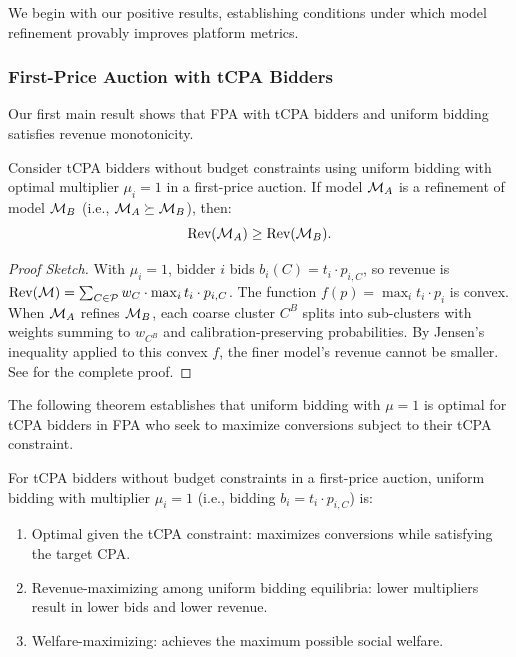 We begin with our positive results, establishing conditions under which model refinement provably improves platform metrics.

\subsubsection{First-Price Auction with tCPA Bidders}

Our first main result shows that FPA with tCPA bidders and uniform bidding satisfies revenue monotonicity.

\begin{theorem}
\label{thm:fpa-revenue}
Consider tCPA bidders without budget constraints using uniform bidding with optimal multiplier $\mu_i = 1$ in a first-price auction. If model $\mathcal{M}_A$ is a refinement of model $\mathcal{M}_B$ (i.e., $\mathcal{M}_A \succeq \mathcal{M}_B$), then:
\begin{equation}
\text{Rev}(\mathcal{M}_A) \geq \text{Rev}(\mathcal{M}_B).
\end{equation}
\end{theorem}

\begin{proof}[Proof Sketch]
With $\mu_i = 1$, bidder $i$ bids $b_i(C) = t_i \cdot p_{i,C}$, so revenue is $\text{Rev}(\mathcal{M}) = \sum_{C \in \mathcal{P}} w_C \cdot \max_i t_i \cdot p_{i,C}$. The function $f(p) = \max_i t_i \cdot p_i$ is convex. When $\mathcal{M}_A$ refines $\mathcal{M}_B$, each coarse cluster $C^B$ splits into sub-clusters with weights summing to $w_{C^B}$ and calibration-preserving probabilities. By Jensen's inequality applied to this convex $f$, the finer model's revenue cannot be smaller. See  for the complete proof.
\end{proof}

The following theorem establishes that uniform bidding with $\mu = 1$ is optimal for tCPA bidders in FPA who seek to maximize conversions subject to their tCPA constraint.

\begin{theorem}
\label{thm:fpa-truthful}
For tCPA bidders without budget constraints in a first-price auction, uniform bidding with multiplier $\mu_i = 1$ (i.e., bidding $b_i = t_i \cdot p_{i,C}$) is:
\begin{enumerate}
    \item Optimal given the tCPA constraint: maximizes conversions while satisfying the target CPA.
    \item Revenue-maximizing among uniform bidding equilibria: lower multipliers result in lower bids and lower revenue.
    \item Welfare-maximizing: achieves the maximum possible social welfare.
\end{enumerate}
\end{theorem}

